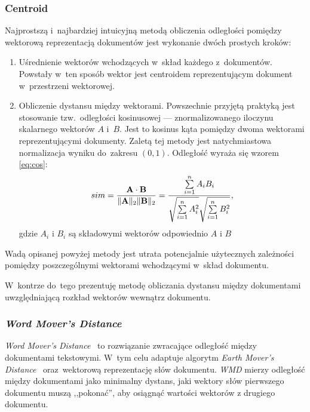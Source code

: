 \documentclass[pl]{minipw} %
\begin{document}
\subsubsection{Centroid}
Najprostszą i~najbardziej intuicyjną metodą obliczenia odległości pomiędzy wektorową reprezentacją dokumentów jest wykonanie dwóch prostych kroków:
\begin{enumerate}
	\item Uśrednienie wektorów wchodzących w~skład każdego z~dokumentów. Powstały w~ten sposób wektor jest centroidem reprezentującym dokument w~przestrzeni wektorowej.
	\item Obliczenie dystansu między wektorami. Powszechnie przyjętą praktyką jest stosowanie tzw.~odległości kosinusowej --- znormalizowanego iloczynu skalarnego wektorów $A$ i~$B$. Jest to kosinus kąta pomiędzy dwoma wektorami reprezentującymi dokumenty. Zaletą tej metody jest natychmiastowa normalizacja wyniku do~zakresu $(0, 1)$. Odległość wyraża się wzorem \ref{eq:cos}:
	\begin{equation}
	\label{eq:cos}
	sim={\mathbf {A} \cdot \mathbf {B}  \over \|\mathbf {A} \|_{2}\|\mathbf {B} \|_{2}}={\frac {\sum \limits _{i=1}^{n}{A_{i}B_{i}}}{{\sqrt {\sum \limits _{i=1}^{n}{A_{i}^{2}}}}{\sqrt {\sum \limits _{i=1}^{n}{B_{i}^{2}}}}}},
	\end{equation}
	gdzie $A_i$ i $B_i$ są składowymi wektorów odpowiednio $A$ i $B$
\end{enumerate}
Wadą opisanej powyżej metody jest utrata potencjalnie użytecznych zależności pomiędzy poszczególnymi wektorami wchodzącymi w~skład dokumentu.

W~kontrze do~tego prezentuję metodę obliczania dystansu między dokumentami uwzględniającą rozkład wektorów wewnątrz dokumentu.

\subsubsection{\textit{Word Mover's Distance}}
\textit{Word Mover's Distance}~\cite{wmd} to rozwiązanie zwracające odległość między dokumentami tekstowymi. W~tym celu adaptuje algorytm \textit{Earth Mover's Distance}~\cite{emd} oraz~wektorową reprezentację słów dokumentu. \textit{WMD} mierzy odległość między dokumentami jako minimalny dystans, jaki wektory słów pierwszego dokumentu muszą ,,pokonać'', aby osiągnąć wartości wektorów z drugiego dokumentu.
\end{document}
